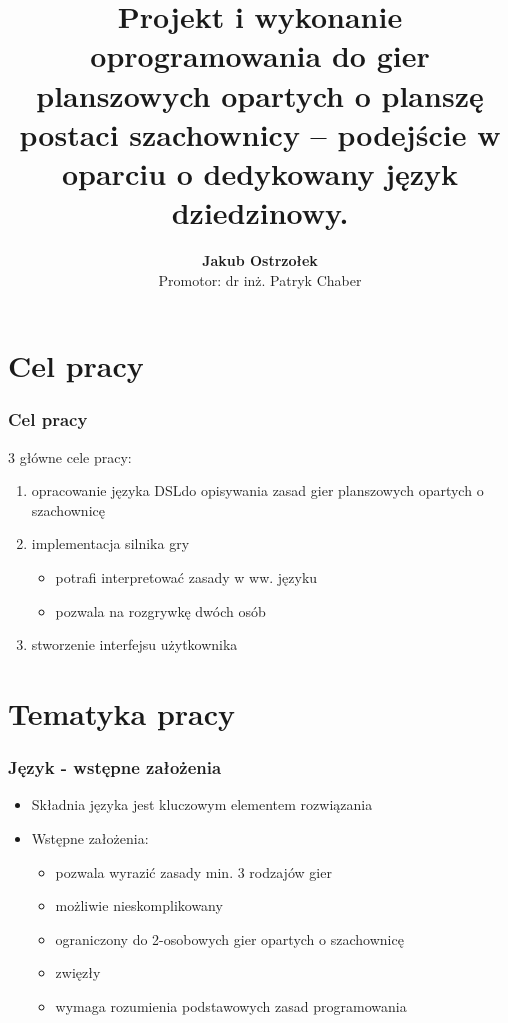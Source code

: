 \documentclass{beamer}
\title[Silnik gier opartych o szachownicę \insertframenumber/\inserttotalframenumber]{
   Projekt i wykonanie oprogramowania do gier planszowych opartych
   o planszę postaci szachownicy -- podejście w oparciu o dedykowany
   język dziedzinowy.}
\author[Jakub Ostrzołek]{\textbf{Jakub Ostrzołek} \\%
\footnotesize Promotor: dr inż. Patryk Chaber}
\institute{Instytut Automatyki i Technik Informacyjnych\\%
Politechnika Warszawska}
\begin{document}
\frame{\titlepage}


\section{Cel pracy}
\begin{frame}
	\frametitle{Cel pracy}
	3 główne cele pracy:
	\begin{enumerate}
		\item opracowanie języka DSL\footnotemark do opisywania zasad gier planszowych opartych o szachownicę
		\item implementacja silnika gry
		      \begin{itemize}
			      \item potrafi interpretować zasady w ww. języku
			      \item pozwala na rozgrywkę dwóch osób
		      \end{itemize}
		\item stworzenie interfejsu użytkownika
	\end{enumerate}
\end{frame}

\section{Tematyka pracy}

\begin{frame}
	\frametitle{Język - wstępne założenia}
	\begin{itemize}
		\item Składnia języka jest kluczowym elementem rozwiązania
		\item Wstępne założenia:
		      \begin{itemize}
			      \item pozwala wyrazić zasady min. 3 rodzajów  gier
			      \item możliwie nieskomplikowany
			      \item ograniczony do 2-osobowych gier opartych o szachownicę
			      \item zwięzły
			      \item wymaga rozumienia podstawowych zasad programowania
		      \end{itemize}
	\end{itemize}
\end{frame}
\end{document}
